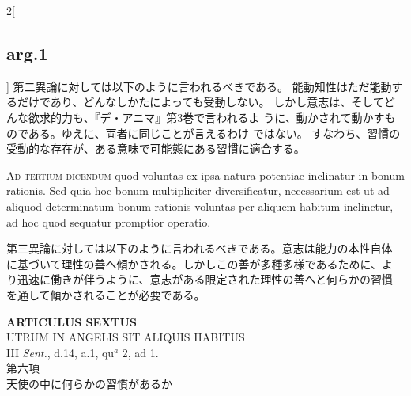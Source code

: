 \documentclass[paper=a4paper,fontsize=10pt,jafontsize=9pt,titlepage]{jlreq}
\begin{document}
\begin{paracol}{2}[\subsection{arg.1}]
第二異論に対しては以下のように言われるべきである。
能動知性はただ能動するだけであり、どんなしかたによっても受動しない。
しかし意志は、そしてどんな欲求的力も、『デ・アニマ』第3巻で言われるよ
 うに、動かされて動かすものである。ゆえに、両者に同じことが言えるわけ
 ではない。
すなわち、習慣の受動的な存在が、ある意味で可能態にある習慣に適合する。

\switchcolumn*[\subsection{ad.3}]

{\scshape Ad tertium dicendum} quod voluntas ex ipsa natura potentiae inclinatur
 in bonum rationis. Sed quia hoc bonum multipliciter diversificatur,
 necessarium est ut ad aliquod determinatum bonum rationis voluntas
 per aliquem habitum inclinetur, ad hoc quod sequatur promptior
 operatio.

\switchcolumn

第三異論に対しては以下のように言われるべきである。意志は能力の本性自体
に基づいて理性の善へ傾かされる。しかしこの善が多種多様であるために、よ
り迅速に働きが伴うように、意志がある限定された理性の善へと何らかの習慣
を通して傾かされることが必要である。

\end{paracol}
\newpage



{}
\setcounter{section}{6}
\setcounter{subsection}{0}
\begin{center}
{\Large {\bfseries ARTICULUS SEXTUS}}\\
{\large UTRUM IN ANGELIS SIT ALIQUIS HABITUS}\\
{\footnotesize III {\itshape Sent.}, d.14, a.1, qu$^{a}$ 2, ad 1.}\\
{\Large 第六項\\天使の中に何らかの習慣があるか}
\end{center}
\end{document}
